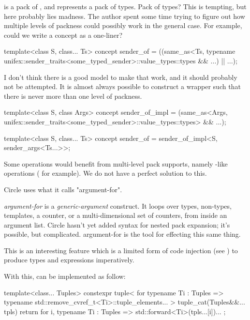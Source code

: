 \documentclass{wg21}
\begin{document}
 is a pack of , and  represents a
pack of types. Pack of types?
This is tempting, but here probably lies madness.
The author spent some time trying to figure out how multiple levels of packness could possibly work in the general case. For example, could we
write a  concept as a one-liner?

\begin{colorblock}
    template<class S, class... Ts>
    concept sender_of = ((same_as<Ts,
    typename unifex::sender_traits<some_typed_sender>::value_types::types && ...) || ...);
\end{colorblock}

I don't think there is a good model to make that work, and it should probably not be attempted.
It is almost always possible to construct a wrapper such that there is never more than one level of packness.

\begin{colorblock}
    template<class S, class Args>
    concept sender_of_impl =
    (same_as<Args, unifex::sender_traits<some_typed_sender>::value_types::types> && ...);

    template<class S, class... Ts>
    concept sender_of = sender_of_impl<S, sender_args<Ts...>>;
\end{colorblock}


Some operations would benefit from multi-level pack supports, namely -like operations ( for example).
We do not have a perfect solution to this.

Circle uses what it calls "argument-for".

\begin{quoteblock}
\emph{argument-for} is a  \emph{generic-argument} construct. It loops over types, non-types, templates, a counter, or a multi-dimensional set of counters, from inside an argument list. Circle hasn't yet added syntax for nested pack expansion; it's possible, but complicated. argument-for is the tool for effecting this same thing.
\end{quoteblock}

This is an interesting feature which is a limited form of code injection (see ) to produce types and expressions imperatively.

With this,  can be implemented as follow:

\begin{colorblock}
    template<class... Tuples>
    constexpr tuple<
    for typename Ti : Tuples =>
        typename std::remove_cvref_t<Ti>::tuple_elements...
    >
    tuple_cat(Tuples&&... tpls) {
        return {
            for i, typename Ti : Tuples => std::forward<Ti>(tpls...[i])...
        };
    }
\end{colorblock}
\end{document}
